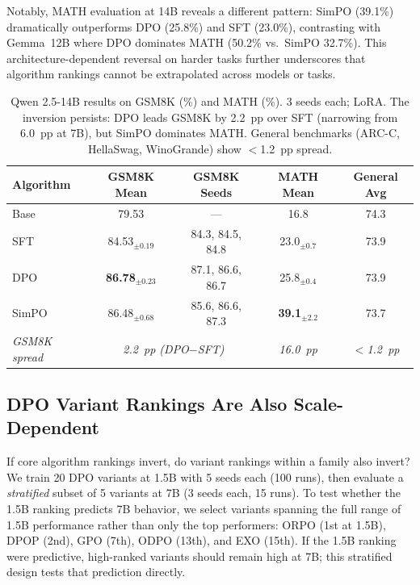 \documentclass{article}
\begin{document}
Notably, MATH evaluation at 14B reveals a different pattern: SimPO (39.1\%) dramatically outperforms DPO (25.8\%) and SFT (23.0\%), contrasting with Gemma~12B where DPO dominates MATH (50.2\% vs.\ SimPO 32.7\%). This architecture-dependent reversal on harder tasks further underscores that algorithm rankings cannot be extrapolated across models or tasks.

\begin{table}[t]
\centering
\caption{Qwen 2.5-14B results on GSM8K (\%) and MATH (\%). 3 seeds each; LoRA. The inversion persists: DPO leads GSM8K by 2.2~pp over SFT (narrowing from 6.0~pp at 7B), but SimPO dominates MATH. General benchmarks (ARC-C, HellaSwag, WinoGrande) show $<$1.2~pp spread.}
\label{tab:14b_results}
\small
\begin{tabular}{@{}lcccc@{}}
\toprule
\textbf{Algorithm} & \textbf{GSM8K Mean} & \textbf{GSM8K Seeds} & \textbf{MATH Mean} & \textbf{General Avg} \\
\midrule
Base & 79.53 & --- & 16.8 & 74.3 \\
SFT & 84.53$_{\pm 0.19}$ & 84.3, 84.5, 84.8 & 23.0$_{\pm 0.7}$ & 73.9 \\
DPO & \textbf{86.78}$_{\pm 0.23}$ & 87.1, 86.6, 86.7 & 25.8$_{\pm 0.4}$ & 73.9 \\
SimPO & 86.48$_{\pm 0.68}$ & 85.6, 86.6, 87.3 & \textbf{39.1}$_{\pm 2.2}$ & 73.7 \\
\midrule
\textit{GSM8K spread} & \multicolumn{2}{c}{\textit{2.2~pp (DPO$-$SFT)}} & \textit{16.0~pp} & \textit{$<$1.2~pp} \\
\bottomrule
\end{tabular}
\end{table}

\subsection{DPO Variant Rankings Are Also Scale-Dependent}
\label{sec:dpo_taxonomy}

If core algorithm rankings invert, do variant rankings within a family also invert?
We train 20 DPO variants at 1.5B with 5 seeds each (100 runs), then evaluate a \emph{stratified} subset of 5 variants at 7B (3 seeds each, 15 runs). To test whether the 1.5B ranking predicts 7B behavior, we select variants spanning the full range of 1.5B performance rather than only the top performers: ORPO (1st at 1.5B), DPOP (2nd), GPO (7th), ODPO (13th), and EXO (15th). If the 1.5B ranking were predictive, high-ranked variants should remain high at 7B; this stratified design tests that prediction directly.
\end{document}
